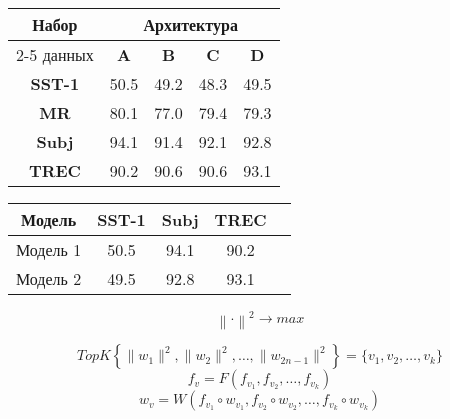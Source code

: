 \documentclass{article}
\begin{document}
\vspace{5mm}
\begin{minipage}{\linewidth}
\begin{tabular}{|c|c|c|c|c|}
\hline
\multirow{2}{*}{Набор}   &             \multicolumn{4}{c|}{Архитектура} \\ \cline{2-5} 
     данных              & \textbf{A}  & \textbf{B} & \textbf{C} & \textbf{D} \\ \hline
\textbf{SST-1}           & 50.5        & 49.2       & 48.3       & 49.5     \\ \hline
\textbf{MR}              & 80.1        & 77.0       & 79.4       & 79.3     \\ \hline
\textbf{Subj}            & 94.1        & 91.4       & 92.1       & 92.8     \\ \hline
\textbf{TREC}            & 90.2        & 90.6       & 90.6       & 93.1     \\ \hline
\end{tabular}
\end{minipage}
\vspace{5mm}


\begin{tabular}{|c|c|c|c|c|}
\hline
Модель    & SST-1    & Subj    & TREC  \\ \hline
Модель 1  & 50.5     & 94.1    & 90.2 \\
Модель 2  & 49.5     & 92.8    & 93.1\\ \hline
\end{tabular}


$$\left\lVert \cdot \right\rVert^2 \to max$$

$$TopK \left\lbrace \lVert  w_1 \rVert^2, \lVert w_2 \rVert^2, \dots, \lVert  w_{2n-1} \rVert^2 \right\rbrace = \{v_1, v_2, \dots, v_k\}$$
$$f_v = F(f_{v_1}, f_{v_2}, \dots, f_{v_k})$$
$$w_v = W(f_{v_1} \circ w_{v_1}, f_{v_2} \circ w_{v_2}, \dots, f_{v_k} \circ w_{v_k})$$
\end{document}
